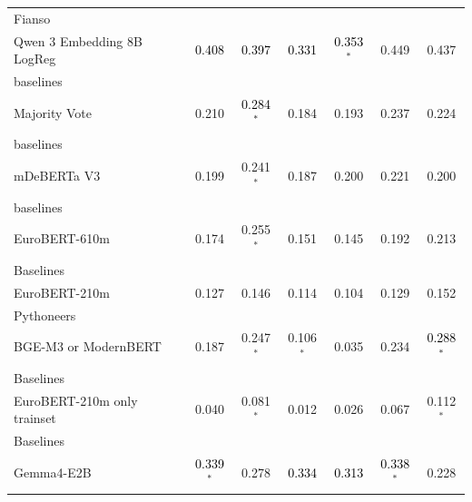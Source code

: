 \begin{tabularx}{\textwidth}{X | c c c c c c}
Fianso\\\subcatarrow{}Qwen 3 Embedding 8B LogReg & \textcolor{Black}{0.408} & \textcolor{Black}{0.397} & \textcolor{Black}{0.331} & \textcolor{Black}{0.353$^{*}$} & \textcolor{White!50!BrickRed}{0.449} & \textcolor{White!50!BrickRed}{0.437} \\
baselines\\\subcatarrow{}Majority Vote & \textcolor{White!50!NavyBlue}{0.210} & \textcolor{Black}{0.284$^{*}$} & \textcolor{White!50!NavyBlue}{0.184} & \textcolor{White!50!NavyBlue}{0.193} & \textcolor{White!50!NavyBlue}{0.237} & \textcolor{White!50!NavyBlue}{0.224} \\
baselines\\\subcatarrow{}mDeBERTa V3 & \textcolor{White!50!NavyBlue}{0.199} & \textcolor{White!50!NavyBlue}{0.241$^{*}$} & \textcolor{White!50!NavyBlue}{0.187} & \textcolor{White!50!NavyBlue}{0.200} & \textcolor{White!50!NavyBlue}{0.221} & \textcolor{White!50!NavyBlue}{0.200} \\
baselines\\\subcatarrow{}EuroBERT-610m & \textcolor{White!50!NavyBlue}{0.174} & \textcolor{White!50!NavyBlue}{0.255$^{*}$} & \textcolor{White!50!NavyBlue}{0.151} & \textcolor{White!50!NavyBlue}{0.145} & \textcolor{White!50!NavyBlue}{0.192} & \textcolor{White!50!NavyBlue}{0.213} \\
Baselines\\\subcatarrow{}EuroBERT-210m & \textcolor{White!50!NavyBlue}{0.127} & \textcolor{White!50!NavyBlue}{0.146} & \textcolor{White!50!NavyBlue}{0.114} & \textcolor{White!50!NavyBlue}{0.104} & \textcolor{NavyBlue}{0.129} & \textcolor{NavyBlue}{0.152} \\
Pythoneers\\\subcatarrow{}BGE-M3 or ModernBERT & \textcolor{White!50!NavyBlue}{0.187} & \textcolor{White!50!NavyBlue}{0.247$^{*}$} & \textcolor{White!50!NavyBlue}{0.106$^{*}$} & \textcolor{NavyBlue}{0.035} & \textcolor{White!50!NavyBlue}{0.234} & \textcolor{Black}{0.288$^{*}$} \\
Baselines\\\subcatarrow{}EuroBERT-210m only trainset & \textcolor{NavyBlue}{0.040} & \textcolor{NavyBlue}{0.081$^{*}$} & \textcolor{NavyBlue}{0.012} & \textcolor{NavyBlue}{0.026} & \textcolor{NavyBlue}{0.067} & \textcolor{NavyBlue}{0.112$^{*}$} \\
Baselines\\\subcatarrow{}Gemma4-E2B & \textcolor{Black}{0.339$^{*}$} & \textcolor{White!50!NavyBlue}{0.278} & \textcolor{Black}{0.334} & \textcolor{Black}{0.313} & \textcolor{Black}{0.338$^{*}$} & \textcolor{White!50!NavyBlue}{0.228} \\

\end{tabularx}
